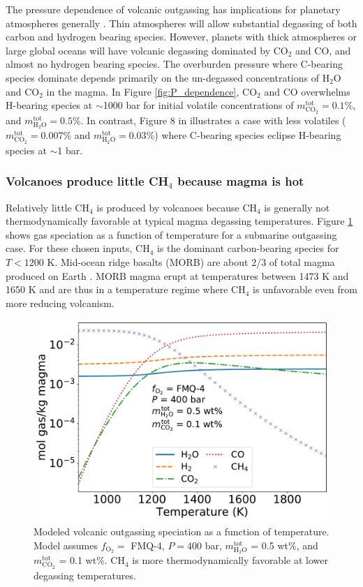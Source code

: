 The pressure dependence of volcanic outgassing has implications for planetary atmospheres generally \citep{Gaillard_2014}. Thin atmospheres will allow substantial degassing of both carbon and hydrogen bearing species. However, planets with thick atmospheres or large global oceans will have volcanic degassing dominated by CO$_2$ and CO, and almost no hydrogen bearing species. The overburden pressure where C-bearing species dominate depends primarily on the un-degassed concentrations of H$_2$O and CO$_2$ in the magma. In Figure \ref{fig:P_dependence}, CO$_2$ and CO overwhelms H-bearing species at $\sim$1000 bar for initial volatile concentrations of $m_\mathrm{CO_2}^\mathrm{tot} = 0.1$\%, and $m_\mathrm{H_2O}^\mathrm{tot} = 0.5$\%. In contrast, Figure 8 in \citet{Gaillard_2014} illustrates a case with less volatiles ($m_\mathrm{CO_2}^\mathrm{tot} = 0.007$\% and $m_\mathrm{H_2O}^\mathrm{tot} = 0.03$\%) where C-bearing species eclipse H-bearing species at $\sim$1 bar.

\subsubsection{Volcanoes produce little CH$_4$ because magma is hot}

Relatively little CH$_4$ is produced by volcanoes because CH$_4$ is generally not thermodynamically favorable at typical magma degassing temperatures. Figure \ref{fig:T_dep} shows gas speciation as a function of temperature for a submarine outgassing case. For these chosen inputs, CH$_4$ is the dominant carbon-bearing species for $T<1200$ K. Mid-ocean ridge basalts (MORB) are about 2/3 of total magma produced on Earth \citep{Crisp_1984}. MORB magma erupt at temperatures between 1473 K and 1650 K \citep{Scheidegger_1973} and are thus in a temperature regime where CH$_4$ is unfavorable even from more reducing volcanism.

\begin{figure}
    \centering
    \includegraphics[width=10 cm]{tex/3methane/figures/T_dependence.pdf}
    \caption{Modeled volcanic outgassing speciation as a function of temperature. Model assumes $f_\mathrm{O_2}=$ FMQ-4, $P=400$ bar, $m_\mathrm{H_2O}^\mathrm{tot}$ = 0.5 wt\%, and $m_\mathrm{CO_2}^\mathrm{tot}$ = 0.1 wt\%. CH$_4$ is more thermodynamically favorable at lower degassing temperatures.}
    \label{fig:T_dep}
\end{figure}

